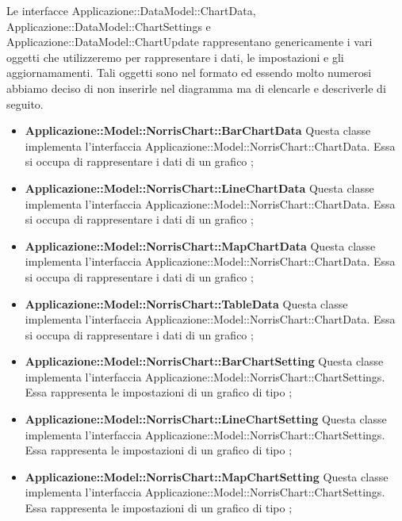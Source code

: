 	Le interfacce Applicazione::DataModel::ChartData, Applicazione::DataModel::ChartSettings e Applicazione::DataModel::ChartUpdate rappresentano genericamente i vari oggetti che utilizzeremo per rappresentare i dati, le impostazioni e gli aggiornamamenti. Tali oggetti sono nel formato  ed essendo molto numerosi abbiamo deciso di non inserirle nel diagramma ma di elencarle e descriverle di seguito.

	\begin{itemize}
		\item \textbf{Applicazione::Model::NorrisChart::BarChartData} Questa classe implementa l'interfaccia Applicazione::Model::NorrisChart::ChartData. Essa si occupa di rappresentare i dati di un grafico ;

		\item \textbf{Applicazione::Model::NorrisChart::LineChartData} Questa classe implementa l'interfaccia Applicazione::Model::NorrisChart::ChartData. Essa si occupa di rappresentare i dati di un grafico ;

		\item \textbf{Applicazione::Model::NorrisChart::MapChartData} Questa classe implementa l'interfaccia Applicazione::Model::NorrisChart::ChartData. Essa si occupa di rappresentare i dati di un grafico ;

		\item \textbf{Applicazione::Model::NorrisChart::TableData} Questa classe implementa l'interfaccia Applicazione::Model::NorrisChart::ChartData. Essa si occupa di rappresentare i dati di un grafico ;

		\item \textbf{Applicazione::Model::NorrisChart::BarChartSetting} Questa classe implementa l'interfaccia Applicazione::Model::NorrisChart::ChartSettings. Essa rappresenta le impostazioni di un grafico di tipo ;

		\item \textbf{Applicazione::Model::NorrisChart::LineChartSetting} Questa classe implementa l'interfaccia Applicazione::Model::NorrisChart::ChartSettings. Essa rappresenta le impostazioni di un grafico di tipo ;

		\item \textbf{Applicazione::Model::NorrisChart::MapChartSetting} Questa classe implementa l'interfaccia Applicazione::Model::NorrisChart::ChartSettings. Essa rappresenta le impostazioni di un grafico di tipo ;


\end{itemize}
